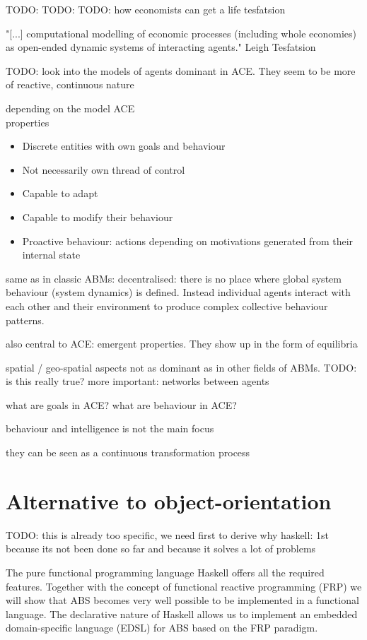 TODO: \cite{Kirman2001}
TODO: \cite{Kaminski2013}
TODO: how economists can get a life  tesfatsion

"[...] computational modelling of economic processes (including whole economies) as open-ended dynamic systems of interacting agents." Leigh Tesfatsion

TODO: look into the models of agents dominant in ACE. They seem to be more of reactive, continuous nature

depending on the model ACE \\

properties
\begin{itemize}
\item Discrete entities with own goals and behaviour
\item Not necessarily own thread of control
\item Capable to adapt 
\item Capable to modify their behaviour
\item Proactive behaviour: actions depending on motivations generated from their internal state
\end{itemize}

same as in classic ABMs: decentralised: there is no place where global system behaviour (system dynamics) is defined. Instead individual agents interact with each other and their environment to produce complex collective behaviour patterns.

also central to ACE: emergent properties. They show up in the form of equilibria

spatial / geo-spatial aspects not as dominant as in other fields of ABMs. TODO: is this really true?
more important: networks between agents

what are goals in ACE?
what are behaviour in ACE?

behaviour and intelligence is not the main focus

they can be seen as a continuous transformation process

\section{Alternative to object-orientation}
TODO: this is already too specific, we need first to derive why haskell: 1st because its not been done so far and because it solves a lot of problems

The pure functional programming language Haskell offers all the required features. Together with the concept of functional reactive programming (FRP) we will show that ABS becomes very well possible to be implemented in a functional language. The declarative nature of Haskell allows us to implement an embedded domain-specific language (EDSL) for ABS based on the FRP paradigm.

